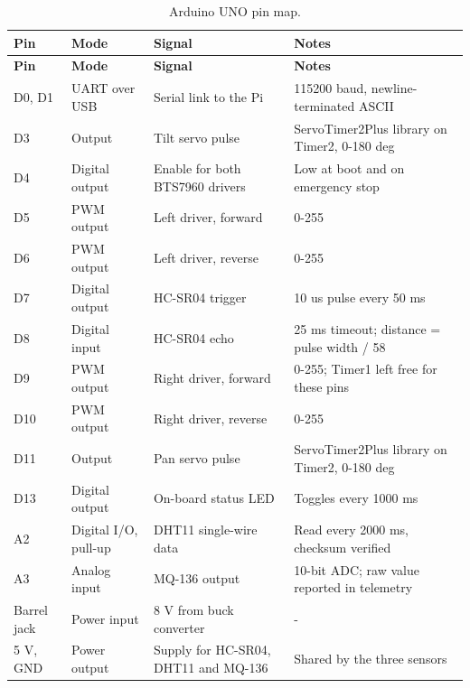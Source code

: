 \begin{center}
\begin{longtable}{|l|l|p{3.5cm}|p{4.5cm}|}
\caption{Arduino UNO pin map.}
\label{tab:arduino-pin-map} \\
\hline
\textbf{Pin} & \textbf{Mode} & \textbf{Signal} & \textbf{Notes} \\
\hline
\endfirsthead
\hline
\textbf{Pin} & \textbf{Mode} & \textbf{Signal} & \textbf{Notes} \\
\hline
\endhead
D0, D1 & UART over USB & Serial link to the Pi & 115200 baud, newline-terminated ASCII \\
\hline
D3 & Output & Tilt servo pulse & ServoTimer2Plus library on Timer2, 0-180 deg \\
\hline
D4 & Digital output & Enable for both BTS7960 drivers & Low at boot and on emergency stop \\
\hline
D5 & PWM output & Left driver, forward & 0-255 \\
\hline
D6 & PWM output & Left driver, reverse & 0-255 \\
\hline
D7 & Digital output & HC-SR04 trigger & 10 us pulse every 50 ms \\
\hline
D8 & Digital input & HC-SR04 echo & 25 ms timeout; distance = pulse width / 58 \\
\hline
D9 & PWM output & Right driver, forward & 0-255; Timer1 left free for these pins \\
\hline
D10 & PWM output & Right driver, reverse & 0-255 \\
\hline
D11 & Output & Pan servo pulse & ServoTimer2Plus library on Timer2, 0-180 deg \\
\hline
D13 & Digital output & On-board status LED & Toggles every 1000 ms \\
\hline
A2 & Digital I/O, pull-up & DHT11 single-wire data & Read every 2000 ms, checksum verified \\
\hline
A3 & Analog input & MQ-136 output & 10-bit ADC; raw value reported in telemetry \\
\hline
Barrel jack & Power input & 8 V from buck converter & - \\
\hline
5 V, GND & Power output & Supply for HC-SR04, DHT11 and MQ-136 & Shared by the three sensors \\
\hline
\end{longtable}
\end{center}

